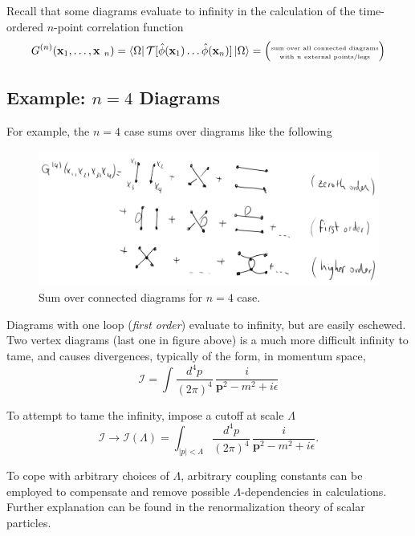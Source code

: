 \noindent Recall that some diagrams evaluate to infinity in the calculation of the time-ordered $n$-point correlation function
\begin{equation}
G^{(n)}(\textbf{x}_1,\dots,\textbf{x
}_n) = \bra{\Omega} \mathcal{T}[\hat{\phi}(\textbf{x}_1) \dots \hat{\phi}(\textbf{x}_n) ] \ket{\Omega} = \left( {\tiny \stackanchor{sum over all connected diagrams}{with $n$ external points/legs} } \right)
\end{equation}

\subsection*{Example: $n=4$ Diagrams}

\noindent For example, the $n=4$ case sums over diagrams like the following

\begin{figure}[H]
	\centering
	\includegraphics[scale=0.4]{g4.png}
	\caption{Sum over connected diagrams for $n=4$ case.}
\end{figure}

\noindent Diagrams with one loop (\textit{first order}) evaluate to infinity, but are easily eschewed. Two vertex diagrams (last one in figure above) is a much more difficult infinity to tame, and causes divergences, typically of the form, in momentum space,
\begin{equation}
\mathcal{I} = \int \frac{d^4 p} {(2\pi)^4} \, \frac{i}{\textbf{p}^2-m^2+i\epsilon}
\end{equation}

\noindent To attempt to tame the infinity, impose a cutoff at scale $\Lambda$
\begin{equation}
\mathcal{I} \to \mathcal{I}(\Lambda) = \int_{|p| < \Lambda} \frac{d^4 p} {(2\pi)^4} \, \frac{i}{\textbf{p}^2-m^2+i\epsilon} .
\end{equation}

\noindent To cope with arbitrary choices of $\Lambda$, arbitrary coupling constants can be employed to compensate and remove possible $\Lambda$-dependencies in calculations. Further explanation can be found in the renormalization theory of scalar particles.

